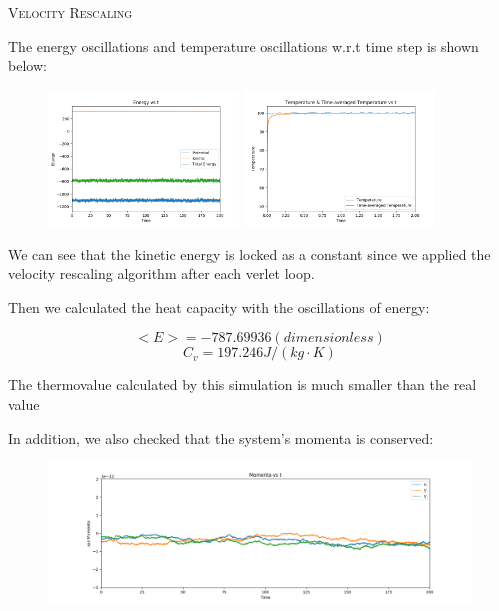 \documentclass{article}
\begin{document}
\begin{spacing}{1}
\vspace{1.5em}
\textsc{\Large Velocity Rescaling}

The energy oscillations and temperature oscillations w.r.t time step is shown below:

\begin{figure}[htbp]
  \centering
  \includegraphics[width=0.45\textwidth]{vs/test/Energy.png}
  \includegraphics[width=0.45\textwidth]{vs/test/T&aT_s.png}
\end{figure}

We can see that the kinetic energy is locked as a constant since we applied the velocity rescaling algorithm after each verlet loop.

Then we calculated the heat capacity with the oscillations of energy:

$$<E> = -787.69936 (dimensionless)$$
$$C_v = 197.246J/(kg\cdot K)$$

The thermovalue calculated by this simulation is much smaller than the real value

In addition, we also checked that the system's momenta is conserved:

\begin{figure}[htbp]
  \centering
  \includegraphics[width=1\textwidth]{vs/test/Momenta.png}
\end{figure}



\end{spacing}
\end{document}
